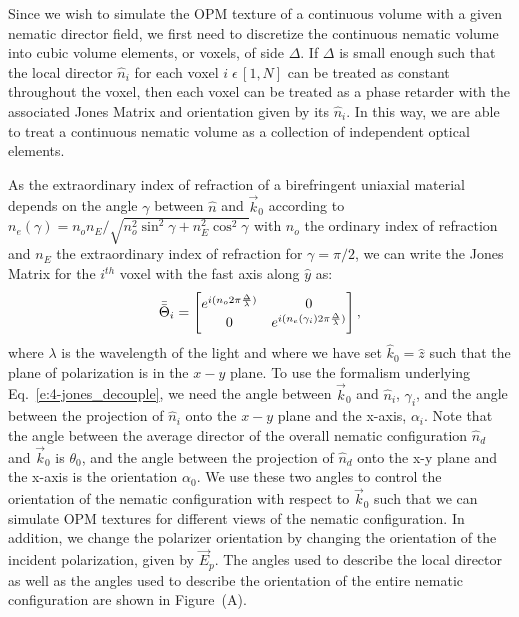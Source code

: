 Since we wish to simulate the OPM texture of a continuous volume with a given nematic director field, we first need to discretize the continuous nematic volume into cubic volume elements, or voxels, of side $\Delta$.
If $\Delta$ is small enough such that the local director $\hat{n}_i$ for each voxel $ i \;\epsilon \, [1,N]$ can be treated as constant throughout the voxel, then each voxel can be treated as a phase retarder with the associated Jones Matrix and orientation given by its $\hat{n}_i$.
In this way, we are able to treat a continuous nematic volume as a collection of independent optical elements.

As the extraordinary index of refraction of a birefringent uniaxial material depends on the angle $\gamma$ between $\hat{n}$ and $\vec{k}_0$ according to $n_e(\gamma) = n_o n_E/\sqrt{n^2_o \sin^2\gamma+n_E^2 \cos^2 \gamma}$ with $n_o$ the ordinary index of refraction and $n_E$ the extraordinary index of refraction for $\gamma = \pi/2$, we can write the Jones Matrix for the $i^{th}$ voxel with the fast axis along $\hat{y}$ as:
\begin{equation}
\bar{\bar{\Theta}}_i  =  \begin{bmatrix}e^{i(n_o2 \pi \frac{\Delta}{\lambda})} & 0 \\ 0 & e^{i (n_e(\gamma_i)2 \pi \frac{\Delta}{\lambda})} \end{bmatrix},
\end{equation}
where $\lambda$ is the wavelength of the light and where we have set $\hat{k}_0=\hat{z}$ such that the plane of polarization is in the $x-y$ plane.
To use the formalism underlying Eq.~\ref{e:4-jones_decouple}, we need the angle between $\vec{k}_0$ and $\hat{n}_i$, $\gamma_i$, and the angle between the projection of $\hat{n}_i$ onto the $x-y$ plane and the x-axis, $\alpha_i$.
Note that the angle between the average director of the overall nematic configuration $\hat{n}_d$ and $\vec{k}_0$ is $\theta_0$, and the angle between the projection of $\hat{n}_d$ onto the x-y plane and the x-axis is the orientation $\alpha_0$.
We use these two angles to control the orientation of the nematic configuration with respect to $\vec{k}_0$ such that we can simulate OPM textures for different views of the nematic configuration.
In addition, we change the polarizer orientation by changing the orientation of the incident polarization, given by $\vec{E}_p$.
The angles used to describe the local director as well as the angles used to describe the orientation of the entire nematic configuration are shown in Figure~(A).
